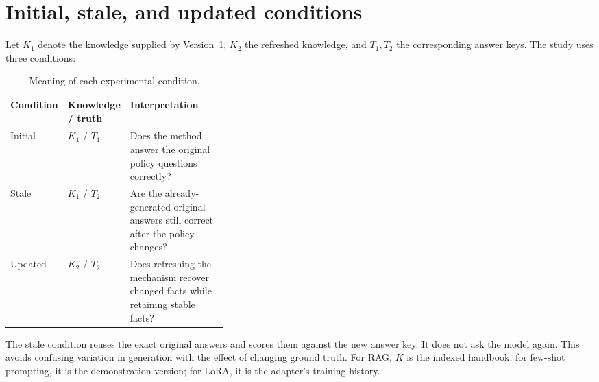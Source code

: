\documentclass[11pt,letterpaper,oneside]{report}
\begin{document}
\section{Initial, stale, and updated conditions}
Let $K_1$ denote the knowledge supplied by Version~1, $K_2$ the refreshed knowledge, and $T_1,T_2$ the corresponding answer keys. The study uses three conditions:
\begin{table}[H]\centering\small
\caption{Meaning of each experimental condition.}
\begin{tabularx}{\linewidth}{P{0.18\linewidth}P{0.19\linewidth}L}\toprule
Condition & Knowledge / truth & Interpretation\\\midrule
Initial & $K_1$ / $T_1$ & Does the method answer the original policy questions correctly?\\
Stale & $K_1$ / $T_2$ & Are the already-generated original answers still correct after the policy changes?\\
Updated & $K_2$ / $T_2$ & Does refreshing the mechanism recover changed facts while retaining stable facts?\\\bottomrule
\end{tabularx}
\end{table}
The stale condition reuses the exact original answers and scores them against the new answer key. It does not ask the model again. This avoids confusing variation in generation with the effect of changing ground truth. For RAG, $K$ is the indexed handbook; for few-shot prompting, it is the demonstration version; for LoRA, it is the adapter's training history.
\end{document}
